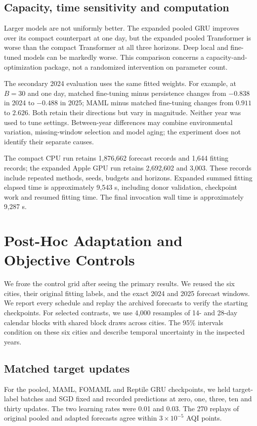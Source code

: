 \documentclass[conference]{IEEEtran}
\begin{document}
\subsection{Capacity, time sensitivity and computation}
Larger models are not uniformly better. The expanded pooled GRU improves over its compact counterpart at one day, but the expanded pooled Transformer is worse than the compact Transformer at all three horizons. Deep local and fine-tuned models can be markedly worse. This comparison concerns a capacity-and-optimization package, not a randomized intervention on parameter count.

The secondary 2024 evaluation uses the same fitted weights. For example, at $B=30$ and one day, matched fine-tuning minus persistence changes from $-0.838$ in 2024 to $-0.488$ in 2025; MAML minus matched fine-tuning changes from $0.911$ to $2.626$. Both retain their directions but vary in magnitude. Neither year was used to tune settings. Between-year differences may combine environmental variation, missing-window selection and model aging; the experiment does not identify their separate causes.

The compact CPU run retains 1,876,662 forecast records and 1,644 fitting records; the expanded Apple GPU run retains 2,692,602 and 3,003. These records include repeated methods, seeds, budgets and horizons. Expanded summed fitting elapsed time is approximately 9,543 s, including donor validation, checkpoint work and resumed fitting time. The final invocation wall time is approximately 9,287 s.

\section{Post-Hoc Adaptation and Objective Controls}
\label{sec:followup}
We froze the control grid after seeing the primary results. We reused the six cities, their original fitting labels, and the exact 2024 and 2025 forecast windows. We report every schedule and replay the archived forecasts to verify the starting checkpoints. For selected contrasts, we use 4,000 resamples of 14- and 28-day calendar blocks with shared block draws across cities. The 95\% intervals condition on these six cities and describe temporal uncertainty in the inspected years.





\subsection{Matched target updates}
For the pooled, MAML, FOMAML and Reptile GRU checkpoints, we held target-label batches and SGD fixed and recorded predictions at zero, one, three, ten and thirty updates. The two learning rates were 0.01 and 0.03. The 270 replays of original pooled and adapted forecasts agree within $3\times10^{-5}$ AQI points.
\end{document}

